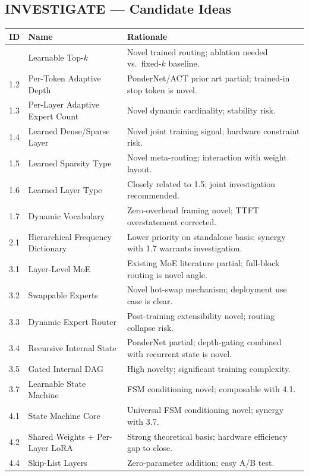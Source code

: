 \documentclass[11pt]{article}
\begin{document}
\subsection{INVESTIGATE --- Candidate Ideas}

\begin{longtable}{lp{5cm}p{7cm}}
\toprule
\textbf{ID} & \textbf{Name} & \textbf{Rationale} \\
\midrule
\endhead
\bottomrule
\endfoot
1.1 & Learnable Top-$k$ & Novel trained routing; ablation needed vs.\ fixed-$k$ baseline. \\
1.2 & Per-Token Adaptive Depth & PonderNet/ACT prior art partial; trained-in stop token is novel. \\
1.3 & Per-Layer Adaptive Expert Count & Novel dynamic cardinality; stability risk. \\
1.4 & Learned Dense/Sparse Layer & Novel joint training signal; hardware constraint risk. \\
1.5 & Learned Sparsity Type & Novel meta-routing; interaction with weight layout. \\
1.6 & Learned Layer Type & Closely related to 1.5; joint investigation recommended. \\
1.7 & Dynamic Vocabulary & Zero-overhead framing novel; TTFT overstatement corrected. \\
2.1 & Hierarchical Frequency Dictionary & Lower priority on standalone basis; synergy with 1.7 warrants investigation. \\
3.1 & Layer-Level MoE & Existing MoE literature partial; full-block routing is novel angle. \\
3.2 & Swappable Experts & Novel hot-swap mechanism; deployment use case is clear. \\
3.3 & Dynamic Expert Router & Post-training extensibility novel; routing collapse risk. \\
3.4 & Recursive Internal State & PonderNet partial; depth-gating combined with recurrent state is novel. \\
3.5 & Gated Internal DAG & High novelty; significant training complexity. \\
3.7 & Learnable State Machine & FSM conditioning novel; composable with 4.1. \\
4.1 & State Machine Core & Universal FSM conditioning novel; synergy with 3.7. \\
4.2 & Shared Weights + Per-Layer LoRA & Strong theoretical basis; hardware efficiency gap to close. \\
4.4 & Skip-List Layers & Zero-parameter addition; easy A/B test. \\

\end{longtable}
\end{document}
